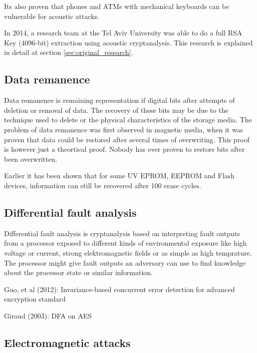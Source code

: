 Its also proven that phones and ATMs with mechanical keyboards can be vulnerable for acoustic attacks\cite{KybdEmanation}.

In 2014, a research team at the Tel Aviv University was able to do a full RSA Key (4096-bit) extraction using acoustic cryptanalysis. 
This research is explained in detail at section \ref{sec:original_research}.

\subsection{Data remanence}\label{sec:data_remanence}

Data remanence is remaining representation if digital bits after attempts of deletion or removal of data. 
The recovery of these bits may be due to the technique used to delete or the physical characteristics of the storage media. 
The problem of data remanence was first observed in magnetic media, when it was proven that data could be restored after several times of overwriting. 
This proof is however just a theortical proof. 
Nobody has ever proven to restore bits after been overwritten. 

Earlier it has been shown that for some UV EPROM, EEPROM and Flash devices, information can still be recovered after 100 erase cycles\cite{data_remanence_flash}.


\subsection{Differential fault analysis}\label{sec:differential_fault_analysis}

Differential fault analysis is cryptanalysis based on interpreting fault outputs from a processor exposed to different kinds of environmental exposure like high voltage or current, strong elektromagnetic fields or as simple as high temprature. 
The processor might give fault outputs an adversary can use to find knowledge about the processor state or similar information.


Guo, et al (2012): Invariance-based concurrent error detection for advanced encryption standard\cite{dfa_guo}

Giraud (2003): DFA on AES\cite{dfa_aes}

\subsection{Electromagnetic attacks}\label{sec:electromagnetic_attacks}

